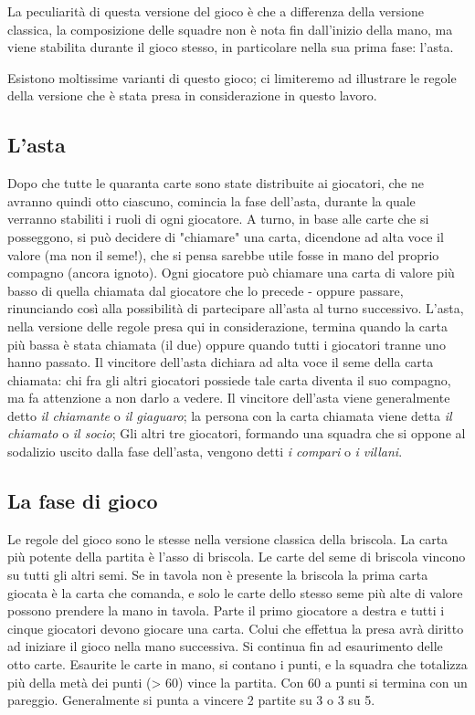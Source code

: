 \documentclass[runningheads,a4paper]{llncs}
\begin{document}
La peculiarità di questa versione del gioco è che a differenza della versione classica, la composizione delle squadre non è nota fin dall'inizio della mano, ma viene stabilita durante il gioco stesso, in particolare nella sua prima fase: l'asta.

Esistono moltissime varianti di questo gioco; ci limiteremo ad illustrare le regole della versione che è stata presa in considerazione in questo lavoro.


\subsection{L'asta}
Dopo che tutte le quaranta carte sono state distribuite ai giocatori, che ne avranno quindi otto ciascuno, comincia la fase dell'asta, durante la quale verranno stabiliti i ruoli di ogni giocatore.
A turno, in base alle carte che si posseggono, si può decidere di "chiamare" una carta, dicendone ad alta voce il valore (ma non il seme!), che si pensa sarebbe utile fosse in mano del proprio compagno (ancora ignoto).
Ogni giocatore può chiamare una carta di valore più basso di quella chiamata dal giocatore che lo precede - oppure passare, rinunciando così alla possibilità di partecipare all'asta al turno successivo.
L'asta, nella versione delle regole presa qui in considerazione, termina quando la carta più bassa è stata chiamata (il due) oppure quando tutti i giocatori tranne uno hanno passato.
Il vincitore dell'asta dichiara ad alta voce il seme della carta chiamata: chi fra gli altri giocatori possiede tale carta diventa il suo compagno, ma fa attenzione a non darlo a vedere.
Il vincitore dell'asta viene generalmente detto \emph{il chiamante} o \emph{il giaguaro};
la persona con la carta chiamata viene detta \emph{il chiamato} o \emph{il socio};
Gli altri tre giocatori, formando una squadra che si oppone al sodalizio uscito dalla fase dell'asta, vengono detti \emph{i compari} o \emph{i villani}.


\subsection{La fase di gioco}

Le regole del gioco sono le stesse nella versione classica della briscola.
La carta più potente della partita è l'asso di briscola.
Le carte del seme di briscola vincono su tutti gli altri semi.
Se in tavola non è presente la briscola la prima carta giocata è la carta che comanda, e solo le carte dello stesso seme più alte di valore possono prendere la mano in tavola.
Parte il primo giocatore a destra e tutti i cinque giocatori devono giocare una carta.
Colui che effettua la presa avrà diritto ad iniziare il gioco nella mano successiva.
Si continua fin ad esaurimento delle otto carte. Esaurite le carte in mano, si contano i punti, e la squadra che totalizza più della metà dei punti (> 60) vince la partita.
Con 60 a punti si termina con un pareggio.
Generalmente si punta a vincere 2 partite su 3 o 3 su 5.
\end{document}
